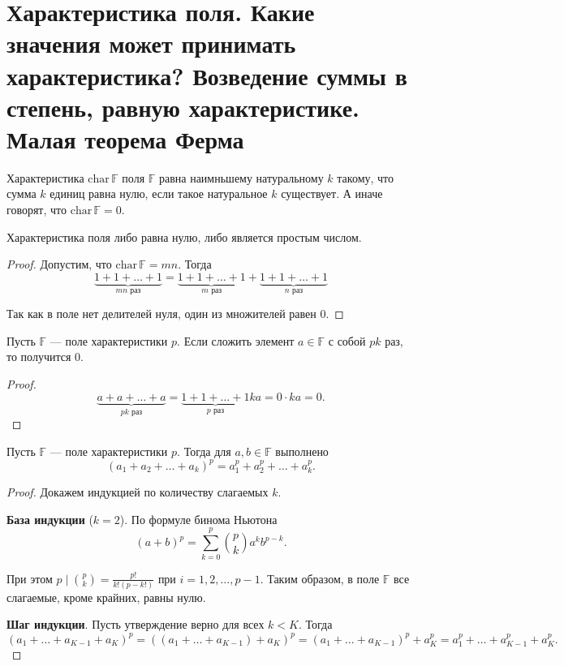 \section{Характеристика поля. Какие значения может принимать характеристика? Возведение суммы в степень, равную характеристике. Малая теорема Ферма}

\begin{definition}
    Характеристика $\mathrm{char}\,\mathbb{F}$ поля $\mathbb{F}$ равна наимньшему натуральному $k$ такому, что сумма $k$ единиц равна нулю, если такое натуральное $k$ существует. А иначе говорят, что $\mathrm{char}\,\mathbb{F} = 0$.
\end{definition}

\begin{theorem}
    Характеристика поля либо равна нулю, либо является простым числом.
\end{theorem}

\begin{proof}
    Допустим, что $\mathrm{char}\, \mathbb{F} = mn$. Тогда
    $$
    \underbrace{1 + 1 + \ldots + 1}_{\text{$mn$ раз}} = \underbrace{1 + 1 + \ldots + 1}_{\text{$m$ раз}} + \underbrace{1 + 1 + \ldots + 1}_{\text{$n$ раз}} 
    $$

    Так как в поле нет делителей нуля, один из множителей равен $0$.
\end{proof}

\begin{lemma}
    Пусть $\mathbb{F}$ --- поле характеристики $p$. Если сложить элемент $a \in \mathbb{F}$ с собой $pk$ раз, то получится $0$.
\end{lemma}

\begin{proof}
    $$
    \underbrace{a + a + \ldots + a}_{\text{$pk$ раз}} = \underbrace{1 + 1 + \ldots + 1}_{\text{$p$ раз}}ka = 0\cdot ka = 0.
    $$
\end{proof}

\begin{theorem}
    Пусть $\mathbb{F}$ --- поле характеристики $p$. Тогда для $a, b \in \mathbb{F}$ выполнено 
    $$(a_1 + a_2 + \ldots + a_k)^p = a_1^p + a_2^p + \ldots + a_k^p.$$
\end{theorem}

\begin{proof}
    Докажем индукцией по количеству слагаемых $k$.

    \textbf{База индукции} ($k = 2$). По формуле бинома Ньютона
    $$
    (a + b)^p = \sum_{k = 0}^p\binom{p}{k}a^kb^{p - k}.
    $$

    При этом $p \mid \binom{p}{k} = \frac{p!}{k!(p - k!)}$ при $i = 1, 2, \ldots, p - 1$. Таким образом, в поле $\mathbb{F}$ все слагаемые, кроме крайних, равны нулю.

    \textbf{Шаг индукции}. Пусть утверждение верно для всех $k < K$. Тогда
    $$
    (a_1 + \ldots + a_{K - 1} + a_K)^p = ((a_1 + \ldots + a_{K - 1}) + a_K)^p = (a_1 + \ldots + a_{K - 1})^p + a_K^p = a_1^p + \ldots + a_{K - 1}^p + a_K^p.
    $$
\end{proof}


